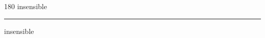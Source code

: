
\begin{frame}
\begin{center}
\begin{turn}{180}
{\fontsize{2.5cm}{1em}\selectfont insensible}
\end{turn}
\vspace{1em}\par  
\hrule
\vspace{1em}\par  
{\fontsize{2.5cm}{1em}\selectfont insensible}
\end{center}
\end{frame}

